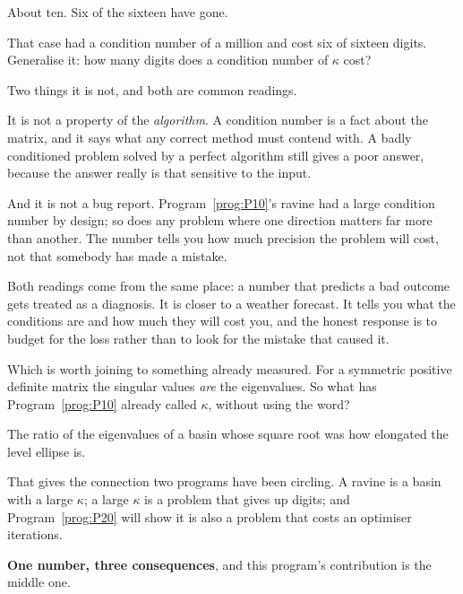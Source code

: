 
\begin{fr}
\begin{ansblock}
About ten. Six of the sixteen have gone.
\end{ansblock}

That case had a condition number of a million and cost six of sixteen digits.
Generalise it: how many digits does a condition number of $\kappa$ cost?
\dotline
\nextframe
\end{fr}

\begin{fr}
Two things it is not, and both are common readings.

It is not a property of the \emph{algorithm}. A condition number is a fact
about the matrix, and it says what any correct method must contend with. A
badly conditioned problem solved by a perfect algorithm still gives a poor
answer, because the answer really is that sensitive to the input.

And it is not a bug report. Program~\ref{prog:P10}'s ravine had a large
condition number by design; so does any problem where one direction matters far
more than another. The number tells you how much precision the problem will
cost, not that somebody has made a mistake.

Both readings come from the same place: a number that predicts a bad outcome
gets treated as a diagnosis. It is closer to a weather forecast. It tells you
what the conditions are and how much they will cost you, and the honest
response is to budget for the loss rather than to look for the mistake that
caused it.

Which is worth joining to something already measured. For a symmetric positive
definite matrix the singular values \emph{are} the eigenvalues. So what has
Program~\ref{prog:P10} already called $\kappa$, without using the word?
\dotline
\nextframe
\end{fr}

\begin{fr}
\begin{ansblock}
The ratio of the eigenvalues of a basin \dash{} whose square root was how
elongated the level ellipse is.
\end{ansblock}

That gives the connection two programs have been circling. A ravine is a basin
with a large $\kappa$; a large $\kappa$ is a problem that gives up digits; and
Program~\ref{prog:P20} will show it is also a problem that costs an optimiser
iterations.

\textbf{One number, three consequences}, and this program's contribution is the
middle one.
\end{fr}

